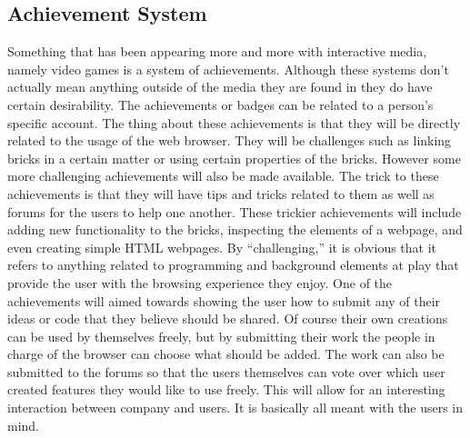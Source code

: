 \documentclass[11pt]{article}
\begin{document}
\subsection{Achievement System}
Something that has been appearing more and more with interactive media, namely video games is a system of achievements. Although these systems don’t actually mean anything outside of the media they are found in they do have certain desirability. The achievements or badges can be related to a person’s specific account. The thing about these achievements is that they will be directly related to the usage of the web browser. They will be challenges such as linking bricks in a certain matter or using certain properties of the bricks. However some more challenging achievements will also be made available. The trick to these achievements is that they will have tips and tricks related to them as well as forums for the users to help one another. These trickier achievements will include adding new functionality to the bricks, inspecting the elements of a webpage, and even creating simple HTML webpages. By “challenging,” it is obvious that it refers to anything related to programming and background elements at play that provide the user with the browsing experience they enjoy. One of the achievements will aimed towards showing the user how to submit any of their ideas or code that they believe should be shared. Of course their own creations can be used by themselves freely, but by submitting their work the people in charge of the browser can choose what should be added. The work can also be submitted to the forums so that the users themselves can vote over which user created features they would like to use freely. This will allow for an interesting interaction between company and users. It is basically all meant with the users in mind.
\end{document}
